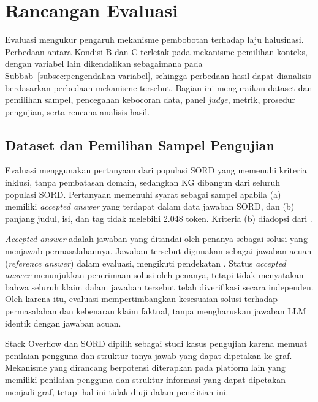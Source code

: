 
\section{Rancangan Evaluasi}
\label{sec:rancangan-evaluasi}

Evaluasi mengukur pengaruh mekanisme pembobotan terhadap laju halusinasi. Perbedaan antara Kondisi B dan C terletak pada mekanisme pemilihan konteks, dengan variabel lain dikendalikan sebagaimana pada Subbab~\ref{subsec:pengendalian-variabel}, sehingga perbedaan hasil dapat dianalisis berdasarkan perbedaan mekanisme tersebut. Bagian ini menguraikan dataset dan pemilihan sampel, pencegahan kebocoran data, panel \emph{judge}, metrik, prosedur pengujian, serta rencana analisis hasil.

\subsection{Dataset dan Pemilihan Sampel Pengujian}
\label{subsec:dataset-sampling}

Evaluasi menggunakan pertanyaan dari populasi SORD \autocite{Fatima2026} yang memenuhi kriteria inklusi, tanpa pembatasan domain, sedangkan KG dibangun dari seluruh populasi SORD. Pertanyaan memenuhi syarat sebagai sampel apabila (a) memiliki \emph{accepted answer} yang terdapat dalam data jawaban SORD, dan (b) panjang judul, isi, dan tag tidak melebihi 2.048 token. Kriteria (b) diadopsi dari \textcite{DaSilva2025}.

\emph{Accepted answer} adalah jawaban yang ditandai oleh penanya sebagai solusi yang menjawab permasalahannya. Jawaban tersebut digunakan sebagai jawaban acuan (\emph{reference answer}) dalam evaluasi, mengikuti pendekatan \textcite{DaSilva2025}. Status \emph{accepted answer} menunjukkan penerimaan solusi oleh penanya, tetapi tidak menyatakan bahwa seluruh klaim dalam jawaban tersebut telah diverifikasi secara independen. Oleh karena itu, evaluasi mempertimbangkan kesesuaian solusi terhadap permasalahan dan kebenaran klaim faktual, tanpa mengharuskan jawaban LLM identik dengan jawaban acuan.

Stack Overflow dan SORD dipilih sebagai studi kasus pengujian karena memuat penilaian pengguna dan struktur tanya jawab yang dapat dipetakan ke graf. Mekanisme yang dirancang berpotensi diterapkan pada platform lain yang memiliki penilaian pengguna dan struktur informasi yang dapat dipetakan menjadi graf, tetapi hal ini tidak diuji dalam penelitian ini.

